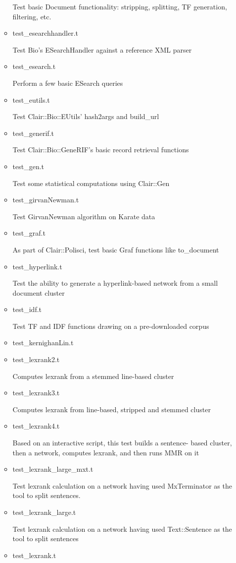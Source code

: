 \begin{itemize}
\begin{itemize}
 Test basic Document functionality: stripping, splitting,
 TF generation, filtering, etc. 
  \item test\_esearchhandler.t

 Test Bio's ESearchHandler against a reference XML parser 
  \item test\_esearch.t

 Perform a few basic ESearch queries 
  \item test\_eutils.t

 Test Clair::Bio::EUtils' hash2args and build\_url 
  \item test\_generif.t

 Test Clair::Bio::GeneRIF's basic record retrieval functions 
  \item test\_gen.t

 Test some statistical computations using Clair::Gen 
  \item test\_girvanNewman.t

 Test GirvanNewman algorithm on Karate data
  \item test\_graf.t

 As part of Clair::Polisci, test basic Graf functions like
 to\_document 
  \item test\_hyperlink.t

 Test the ability to generate a hyperlink-based network from
 a small document cluster 
  \item test\_idf.t

 Test TF and IDF functions drawing on a pre-downloaded corpus 
  \item test\_kernighanLin.t

  \item test\_lexrank2.t

 Computes lexrank from a stemmed line-based cluster 
  \item test\_lexrank3.t

 Computes lexrank from line-based, stripped and stemmed
 cluster 
  \item test\_lexrank4.t

 Based on an interactive script, this test builds a sentence-
 based cluster, then a network, computes lexrank, and then
 runs MMR on it 
  \item test\_lexrank\_large\_mxt.t

 Test lexrank calculation on a network having used MxTerminator
 as the tool to split sentences. 
  \item test\_lexrank\_large.t

 Test lexrank calculation on a network having used
 Text::Sentence as the tool to split sentences 
  \item test\_lexrank.t


\end{itemize}
\end{itemize}
